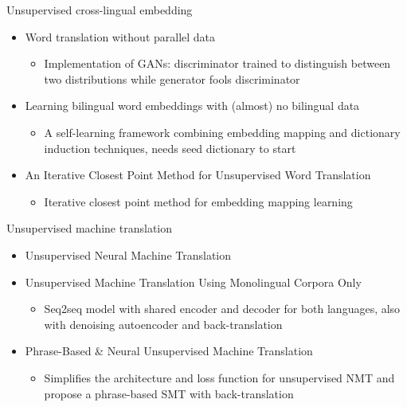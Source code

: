 \documentclass[11pt, a4paper, landscape]{article}
\begin{document}
	
	
	
	\NewPage
	
	\vfill
	Unsupervised cross-lingual embedding
	\begin{itemize}
		\item 	\cite{conneau2017word} Word translation without parallel data
		\begin{itemize}
		\item Implementation of GANs: discriminator trained to distinguish between two distributions while generator fools discriminator 
		\end{itemize}	
		\item 	\cite{artetxe2017learning} Learning bilingual word embeddings with (almost) no bilingual data
		\begin{itemize}
			\item A self-learning framework combining embedding mapping and dictionary induction techniques, needs seed dictionary to start
		\end{itemize}	    
		\item \cite{hoshen2018iterative} An Iterative Closest Point Method for Unsupervised Word Translation	    
		\begin{itemize}
			\item Iterative closest point method for embedding mapping learning
		\end{itemize}	    
	\end{itemize}
	
	
	
	
	
	
	\vfill
	
	\NewPage
	
	\vfill
	Unsupervised machine translation
	\begin{itemize}
		\item 	\cite{artetxe2017unsupervised} Unsupervised Neural Machine Translation
		\item \cite{lample2017unsupervised} Unsupervised Machine Translation Using Monolingual Corpora Only
		\begin{itemize} 
			\item Seq2seq model with shared encoder and decoder for both languages, also with denoising autoencoder and back-translation
		\end{itemize}
		
		\item \cite{artetxe2017unsupervised} Phrase-Based \& Neural Unsupervised Machine Translation
		\begin{itemize}
			\item Simplifies the architecture and loss function for unsupervised NMT and propose a phrase-based SMT with back-translation
		\end{itemize}	
		

	\end{itemize}
	
\end{document}
